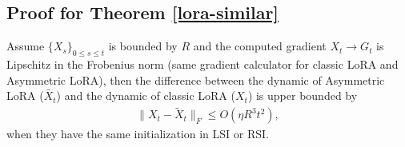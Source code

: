 \subsection{Proof for Theorem \ref{lora-similar}}
\label{lora-similar-proof}
\begin{theorem}
    Assume $\{X_s\}_{0\leq s\leq t}$ is bounded by $R$ and the computed gradient $X_t\to G_t$ is Lipschitz in the Frobenius norm (same gradient calculator for classic LoRA and Asymmetric LoRA), then the difference between the dynamic of Asymmetric LoRA ($\tilde{X_t}$) and the dynamic of classic LoRA ($X_t$) is upper bounded by
    \begin{align}
        \|X_t-\tilde{X}_t\|_F\leq O(\eta R^3t^2),
    \end{align}
    when they have the same initialization in LSI or RSI. 
\end{theorem}
